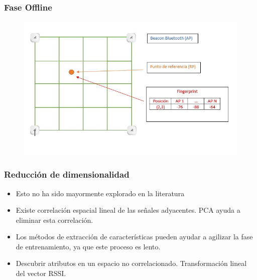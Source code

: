 \documentclass[mathserif]{beamer}
\begin{document}

\begin{frame}
\frametitle{Fase Offline}

\begin{figure}
\includegraphics[width=\textwidth]{../figures/fingerprints.jpg}
\end{figure}

\end{frame}


\begin{frame}
\frametitle{Reducción de dimensionalidad}

\begin{itemize}

\item Esto no ha sido mayormente explorado en la literatura

\pause
\item Existe correlación espacial lineal de las señales adyacentes. PCA ayuda a eliminar esta correlación.
\pause

\item Los métodos de extracción de características pueden ayudar a agilizar la fase de entrenamiento, ya que este proceso es lento.

\pause

\item Descubrir atributos en un espacio no correlacionado. Transformación lineal del vector RSSI.

\end{itemize}

\end{frame}
\end{document}
